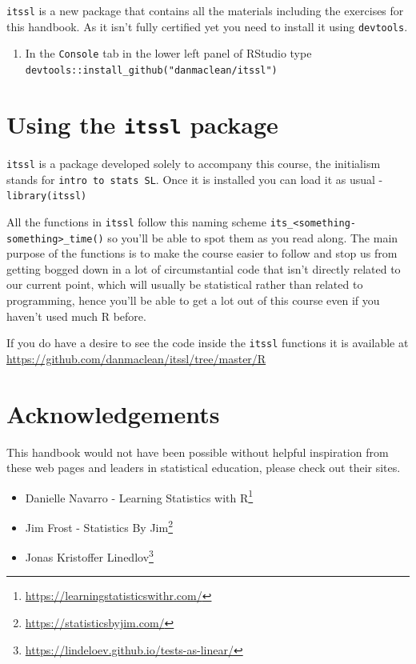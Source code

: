 \documentclass[
]{book}
\providecommand{\tightlist}{%
  \setlength{\itemsep}{0pt}\setlength{\parskip}{0pt}}
\renewcommand{\href}[2]{#2\footnote{\url{#1}}}
\begin{document}
\texttt{itssl} is a new package that contains all the materials including the exercises for this handbook. As it isn't fully certified yet you need to install it using \texttt{devtools}.

\begin{enumerate}
\def\labelenumi{\arabic{enumi}.}
\tightlist
\item
  In the \texttt{Console} tab in the lower left panel of RStudio type \texttt{devtools::install\_github("danmaclean/itssl")}
\end{enumerate}

\hypertarget{using-the-itssl-package}{%
\section{\texorpdfstring{Using the \texttt{itssl} package}{Using the itssl package}}\label{using-the-itssl-package}}

\texttt{itssl} is a package developed solely to accompany this course, the initialism stands for \texttt{intro\ to\ stats\ SL}. Once it is installed you can load it as usual - \texttt{library(itssl)}

All the functions in \texttt{itssl} follow this naming scheme \texttt{its\_\textless{}something-something\textgreater{}\_time()} so you'll be able to spot them as you read along. The main purpose of the functions is to make the course easier to follow and stop us from getting bogged down in a lot of circumstantial code that isn't directly related to our current point, which will usually be statistical rather than related to programming, hence you'll be able to get a lot out of this course even if you haven't used much R before.

If you do have a desire to see the code inside the \texttt{itssl} functions it is available at \url{https://github.com/danmaclean/itssl/tree/master/R}

\hypertarget{acknowledgements}{%
\section{Acknowledgements}\label{acknowledgements}}

This handbook would not have been possible without helpful inspiration from these web pages and leaders in statistical education, please check out their sites.

\begin{itemize}
\tightlist
\item
  \href{https://learningstatisticswithr.com/}{Danielle Navarro - Learning Statistics with R}
\item
  \href{https://statisticsbyjim.com/}{Jim Frost - Statistics By Jim}
\item
  \href{https://lindeloev.github.io/tests-as-linear/}{Jonas Kristoffer Linedlov}
\end{itemize}
\end{document}
